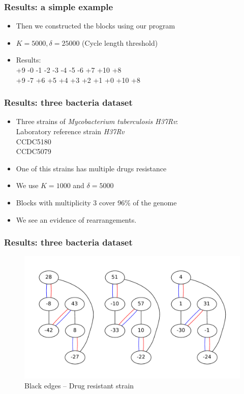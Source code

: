 \documentclass[svgnames,14pt]{beamer}
\begin{document}
\begin{frame}
\frametitle{Results: a simple example}
\begin{itemize}
\item Then we constructed the blocks using our program
\item \(K = 5000, \delta = 25000\) (Cycle length threshold)
\item Results: \\
+9 -0 -1 -2 -3 -4 -5 -6 +7 +10 +8 \\
+9 -7 +6 +5 +4 +3 +2 +1 +0 +10 +8 \\
\end{itemize}
\end{frame}

\begin{frame}
\frametitle{Results: three bacteria dataset}
\begin{itemize}
\item Three strains of \textit{Mycobacterium tuberculosis H37Rv}: \\
Laboratory reference strain \textit{H37Rv} \\
CCDC5180 \\
CCDC5079 \\
\item One of this strains has multiple drugs resistance
\item We use \(K = 1000\) and \(\delta = 5000\)
\item Blocks with multiplicity 3 cover 96\% of the genome
\item We see an evidence of rearrangements.
\end{itemize}
\end{frame}

\begin{frame}
\frametitle{Results: three bacteria dataset}
\begin{changemargin}{-1.cm}{-1.cm}
\begin{figure}
\centering
\includegraphics[scale = 0.50]{tuber.pdf}
\small \caption{Black edges -- Drug resistant strain}
\end{figure}
\end{changemargin}
\end{frame}
\end{document}
